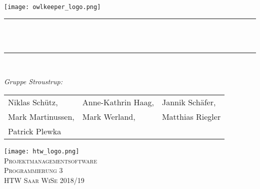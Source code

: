 
\begin{titlepage}
	\centering
    \vspace*{0.5 cm}
    \texttt{[image: owlkeeper\_logo.png]}\\[1.0 cm]							%
   	
	\centering
	\rule{\linewidth}{0.2 mm} \\[0.4 cm]
	{ \huge \bfseries \thetitle}\\
	\rule{\linewidth}{0.2 mm} \\[1.5 cm]

	\begin{flushleft} \large
		\emph{Gruppe Stroustrup:}\\
		\begin{tabular}{ p{} p{} p{} }
			Niklas Schütz, & Anne-Kathrin Haag, & Jannik Schäfer, \\
			Mark Martinussen, & Mark Werland,  & Matthias Riegler \\
			Patrick Plewka & & \\ 
		\end{tabular}
	\end{flushleft}

	\vfill
	\begin{flushleft}
			 \texttt{[image: htw\_logo.png]} \\
	\textsc{Projektmanagementsoftware} \\
	\textsc{Programmierung 3} \\
	\textsc{HTW Saar WiSe 2018/19} \\
		
	\end{flushleft}
\end{titlepage}